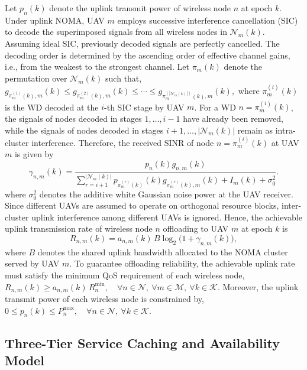 \documentclass[journal]{IEEEtran}
\begin{document}
Let $p_n(k)$ denote the uplink transmit power of wireless node $n$ at
epoch $k$. Under uplink NOMA, UAV $m$ employs successive interference
cancellation (SIC) to decode the superimposed signals from all wireless
nodes in $\mathcal{N}_m(k)$. Assuming ideal SIC, previously decoded
signals are perfectly cancelled. The decoding order is determined by the
ascending order of effective channel gains, i.e., from the weakest to
the strongest channel. Let $\pi_m(k)$ denote the permutation over
$\mathcal{N}_m(k)$ such that, $g_{\pi_m^{(1)}(k),m}(k)
    \le g_{\pi_m^{(2)}(k),m}(k)
    \le \cdots
    \le g_{\pi_m^{(|\mathcal{N}_m(k)|)}(k),m}(k),
\label{eq:sic_order}$
where $\pi_m^{(i)}(k)$ is the WD decoded at the $i$-th SIC stage by UAV $m$. For a WD $n=\pi_m^{(i)}(k)$, the signals of nodes decoded in stages $1,\dots,i-1$ have already been removed, while the signals of
nodes decoded in stages $i+1,\dots,|\mathcal{N}_m(k)|$ remain as intra-cluster interference. Therefore, the received SINR of node
$n=\pi_m^{(i)}(k)$ at UAV $m$ is given by
\begin{equation}
\gamma_{n,m}(k)=
\textstyle\frac{p_n(k)g_{n,m}(k)}
{\sum_{r=i+1}^{|\mathcal{N}_m(k)|}p_{\pi_m^{(r)}(k)}(k)g_{\pi_m^{(r)}(k),m}(k)+I_m(k)+\sigma_0^2}.
\label{eq:sinr_noma}
\end{equation}
where $\sigma_0^2$ denotes the additive white Gaussian noise power at
the UAV receiver. Since different UAVs are assumed to operate on orthogonal resource
blocks, inter-cluster uplink interference among different UAVs is
ignored. Hence, the achievable uplink transmission rate of wireless node
$n$ offloading to UAV $m$ at epoch $k$ is
\begin{equation}
    R_{n,m}(k)
    = a_{n,m}(k)\, B
    \log_2\!\bigl(1+\gamma_{n,m}(k)\bigr),
\label{eq:rate_noma}
\end{equation}
where $B$ denotes the shared uplink bandwidth allocated to the NOMA
cluster served by UAV $m$. To guarantee offloading reliability, the achievable uplink rate must
satisfy the minimum QoS requirement of each wireless node, $R_{n,m}(k)
    \ge a_{n,m}(k)\, R_n^{\min},
    \quad \forall n\in\mathcal{N},\ \forall m\in\mathcal{M},\
    \forall k\in\mathcal{K}.
\label{eq:qos_constraint}$ Moreover, the uplink transmit power of each wireless node is constrained by, $0 \le p_n(k) \le P_n^{\max},
    \quad \forall n\in\mathcal{N},\ \forall k\in\mathcal{K}.
\label{eq:power_constraint}$

\subsection{Three-Tier Service Caching and Availability Model}
\label{sec:caching_model}
\end{document}
